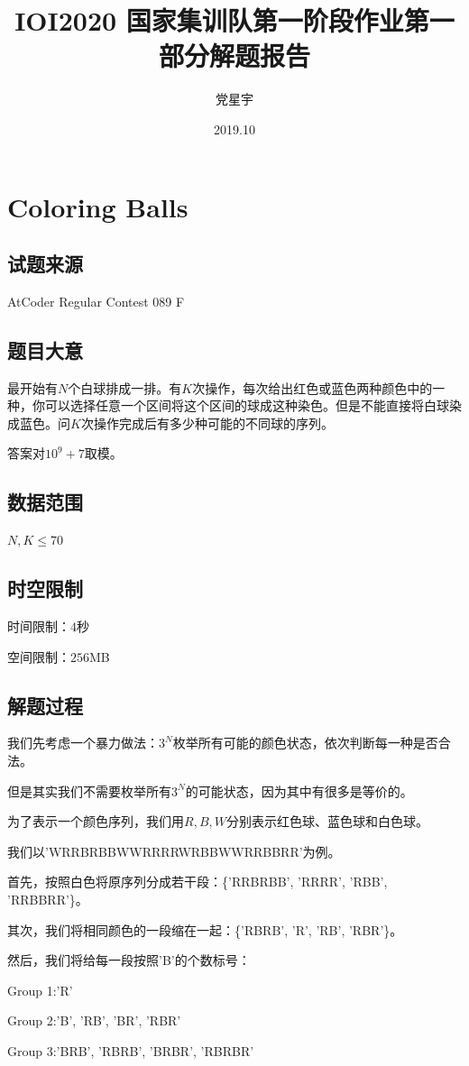 \documentclass[12pt]{article}
\title{IOI2020 国家集训队第一阶段作业第一部分解题报告}
\author{党星宇}
\date{2019.10}
\begin{document}
\maketitle

\newpage

\section{Coloring Balls}
\subsection{试题来源}
AtCoder Regular Contest 089 F
\subsection{题目大意}
最开始有$N$个白球排成一排。有$K$次操作，每次给出红色或蓝色两种颜色中的一种，你可以选择任意一个区间将这个区间的球成这种染色。但是不能直接将白球染成蓝色。问$K$次操作完成后有多少种可能的不同球的序列。

答案对$10^9+7$取模。
\subsection{数据范围}
$N,K\le 70$
\subsection{时空限制}
时间限制：$4$秒

空间限制：$256$MB
\subsection{解题过程}
我们先考虑一个暴力做法：$3^N$枚举所有可能的颜色状态，依次判断每一种是否合法。

但是其实我们不需要枚举所有$3^N$的可能状态，因为其中有很多是等价的。

为了表示一个颜色序列，我们用$R,B,W$分别表示红色球、蓝色球和白色球。

我们以'WRRBRBBWWRRRRWRBBWWRRBBRR'为例。

首先，按照白色将原序列分成若干段：\{'RRBRBB', 'RRRR', 'RBB', 'RRBBRR'\}。

其次，我们将相同颜色的一段缩在一起：\{'RBRB', 'R', 'RB', 'RBR'\}。

然后，我们将给每一段按照'B'的个数标号：

Group 1:'R'

Group 2:'B', 'RB', 'BR', 'RBR'

Group 3:'BRB', 'RBRB', 'BRBR', 'RBRBR'
\end{document}
